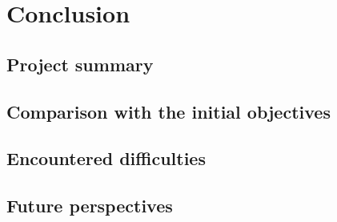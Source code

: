 \chapter{Conclusion}
\label{chap:conclusion}

\section{Project summary}

\section{Comparison with the initial objectives}

\section{Encountered difficulties}

\section{Future perspectives}

